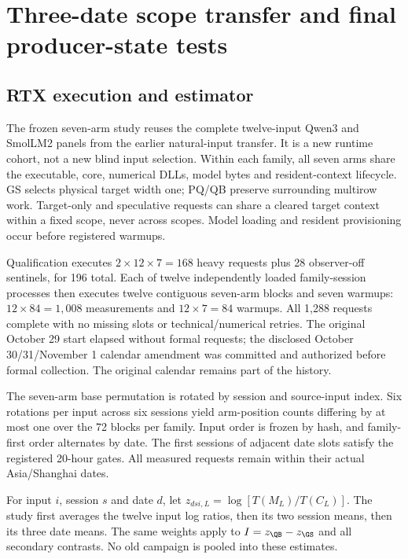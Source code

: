 \section{Three-date scope transfer and final producer-state tests}
\label{supp:finaltransfer}
\subsection{RTX execution and estimator}
The frozen seven-arm study reuses the complete twelve-input Qwen3 and SmolLM2 panels from the earlier natural-input transfer. It is a new runtime cohort, not a new blind input selection. Within each family, all seven arms share the executable, core, numerical DLLs, model bytes and resident-context lifecycle. GS selects physical target width one; PQ/QB preserve surrounding multirow work. Target-only and speculative requests can share a cleared target context within a fixed scope, never across scopes. Model loading and resident provisioning occur before registered warmups.

Qualification executes $2\times12\times7=168$ heavy requests plus 28 observer-off sentinels, for 196 total. Each of twelve independently loaded family-session processes then executes twelve contiguous seven-arm blocks and seven warmups: $12\times84=1,008$ measurements and $12\times7=84$ warmups. All 1,288 requests complete with no missing slots or technical/numerical retries. The original October 29 start elapsed without formal requests; the disclosed October 30/31/November 1 calendar amendment was committed and authorized before formal collection. The original calendar remains part of the history.

The seven-arm base permutation is rotated by session and source-input index. Six rotations per input across six sessions yield arm-position counts differing by at most one over the 72 blocks per family. Input order is frozen by hash, and family-first order alternates by date. The first sessions of adjacent date slots satisfy the registered 20-hour gates. All measured requests remain within their actual Asia/Shanghai dates.

For input $i$, session $s$ and date $d$, let $z_{dsi,L}=\log[T(M_L)/T(C_L)]$. The study first averages the twelve input log ratios, then its two session means, then its three date means. The same weights apply to $I=z_{\QB}-z_{\GS}$ and all secondary contrasts. No old campaign is pooled into these estimates.





